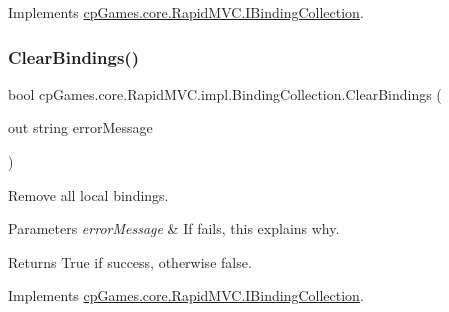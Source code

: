 Implements \mbox{\hyperlink{interfacecp_games_1_1core_1_1_rapid_m_v_c_1_1_i_binding_collection_a2a468c5570b780133763d9592e2c1cb5}{cp\+Games.\+core.\+Rapid\+M\+V\+C.\+I\+Binding\+Collection}}.

\mbox{\label{classcp_games_1_1core_1_1_rapid_m_v_c_1_1impl_1_1_binding_collection_a131a853ccd88179353f3a875cccc7637}} 
\subsubsection{\texorpdfstring{ClearBindings()}{ClearBindings()}}
{\footnotesize\ttfamily bool cp\+Games.\+core.\+Rapid\+M\+V\+C.\+impl.\+Binding\+Collection.\+Clear\+Bindings (\begin{DoxyParamCaption}\item[{out string}]{error\+Message }\end{DoxyParamCaption})}



Remove all local bindings. 


\begin{DoxyParams}{Parameters}
{\em error\+Message} & If fails, this explains why.\\
\hline
\end{DoxyParams}
\begin{DoxyReturn}{Returns}
True if success, otherwise false.
\end{DoxyReturn}


Implements \mbox{\hyperlink{interfacecp_games_1_1core_1_1_rapid_m_v_c_1_1_i_binding_collection_a81689073a35a424a96982276d64a27ad}{cp\+Games.\+core.\+Rapid\+M\+V\+C.\+I\+Binding\+Collection}}.

\mbox{\label{classcp_games_1_1core_1_1_rapid_m_v_c_1_1impl_1_1_binding_collection_a6bfcca10ac176a8e624072e848412877}} 
